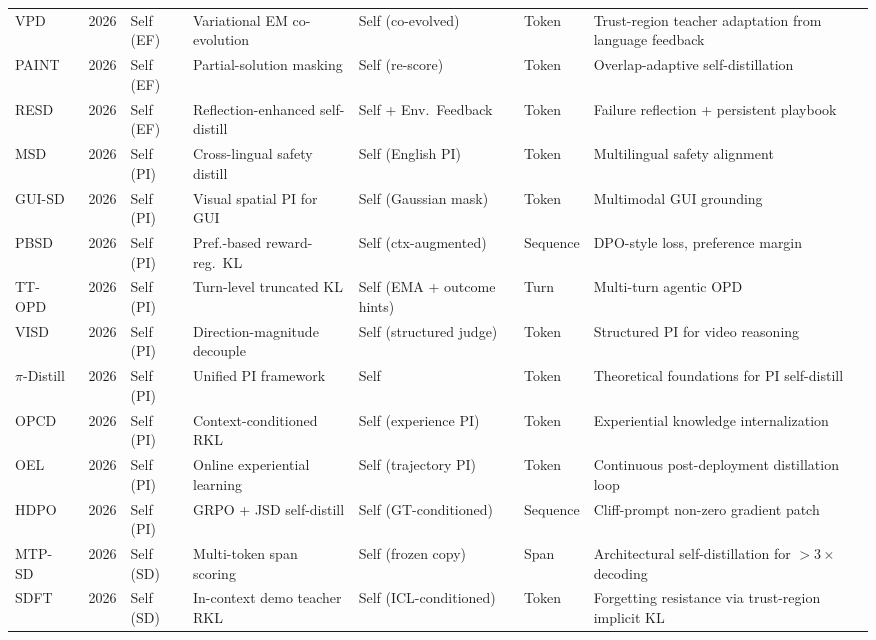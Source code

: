\documentclass{article} %
\begin{document}
\begin{table}[t]
{\begin{tabular}{@{}lclllll@{}}
        VPD~\citep{2605.15113} & 2026 & Self (EF) & Variational EM co-evolution & Self (co-evolved) & Token & Trust-region teacher adaptation from language feedback \\
        PAINT~\citep{2604.26573} & 2026 & Self (EF) & Partial-solution masking & Self (re-score) & Token & Overlap-adaptive self-distillation \\
        RESD~\citep{2605.12741} & 2026 & Self (EF) & Reflection-enhanced self-distill & Self + Env.~Feedback & Token & Failure reflection + persistent playbook \\
        MSD~\citep{2605.02971} & 2026 & Self (PI) & Cross-lingual safety distill & Self (English PI) & Token & Multilingual safety alignment \\
        GUI-SD~\citep{2605.00642} & 2026 & Self (PI) & Visual spatial PI for GUI & Self (Gaussian mask) & Token & Multimodal GUI grounding \\
        PBSD~\citep{2605.05040} & 2026 & Self (PI) & Pref.-based reward-reg.\ KL & Self (ctx-augmented) & Sequence & DPO-style loss, preference margin \\
        TT-OPD~\citep{2605.02943} & 2026 & Self (PI) & Turn-level truncated KL & Self (EMA + outcome hints) & Turn & Multi-turn agentic OPD \\
        VISD~\citep{2605.06094} & 2026 & Self (PI) & Direction-magnitude decouple & Self (structured judge) & Token & Structured PI for video reasoning \\
        $\pi$-Distill~\citep{2602.04942} & 2026 & Self (PI) & Unified PI framework & Self & Token & Theoretical foundations for PI self-distill \\
        OPCD~\citep{2602.12275} & 2026 & Self (PI) & Context-conditioned RKL & Self (experience PI) & Token & Experiential knowledge internalization \\
        OEL~\citep{2603.16856} & 2026 & Self (PI) & Online experiential learning & Self (trajectory PI) & Token & Continuous post-deployment distillation loop \\
        HDPO~\citep{2603.23871} & 2026 & Self (PI) & GRPO + JSD self-distill & Self (GT-conditioned) & Sequence & Cliff-prompt non-zero gradient patch \\
        MTP-SD~\citep{2602.06019} & 2026 & Self (SD) & Multi-token span scoring & Self (frozen copy) & Span & Architectural self-distillation for $>3\times$ decoding \\
        SDFT~\citep{2601.19897} & 2026 & Self (SD) & In-context demo teacher RKL & Self (ICL-conditioned) & Token & Forgetting resistance via trust-region implicit KL \\

\end{tabular}}
\end{table}
\end{document}

